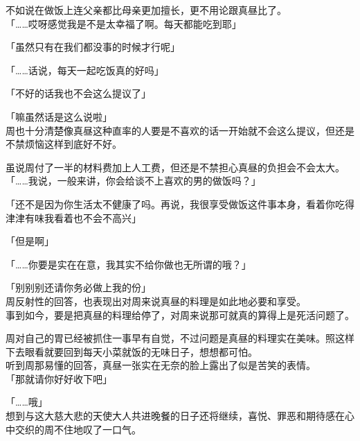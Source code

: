 不如说在做饭上连父亲都比母亲更加擅长，更不用论跟真昼比了。\\

「……哎呀感觉我是不是太幸福了啊。每天都能吃到耶」

「虽然只有在我们都没事的时候才行呢」

「……话说，每天一起吃饭真的好吗」

「不好的话我也不会这么提议了」

「嘛虽然话是这么说啦」\\

周也十分清楚像真昼这种直率的人要是不喜欢的话一开始就不会这么提议，但还是不禁烦恼这样到底好不好。

虽说周付了一半的材料费加上人工费，但还是不禁担心真昼的负担会不会太大。\\

「……我说，一般来讲，你会给谈不上喜欢的男的做饭吗？」

「还不是因为你生活太不健康了吗。再说，我很享受做饭这件事本身，看着你吃得津津有味我看着也不会不高兴」

「但是啊」

「……你要是实在在意，我其实不给你做也无所谓的哦？」

「别别别还请你务必做上我的份」\\

周反射性的回答，也表现出对周来说真昼的料理是如此地必要和享受。\\

事到如今，要是把真昼的料理给停了，对周来说那可就真的算得上是死活问题了。

周对自己的胃已经被抓住一事早有自觉，不过问题是真昼的料理实在美味。照这样下去眼看就要回到每天小菜就饭的无味日子，想想都可怕。\\

听到周那易懂的回答，真昼一张实在无奈的脸上露出了似是苦笑的表情。\\

「那就请你好好收下吧」

「……哦」\\

想到与这大慈大悲的天使大人共进晚餐的日子还将继续，喜悦、罪恶和期待感在心中交织的周不住地叹了一口气。
